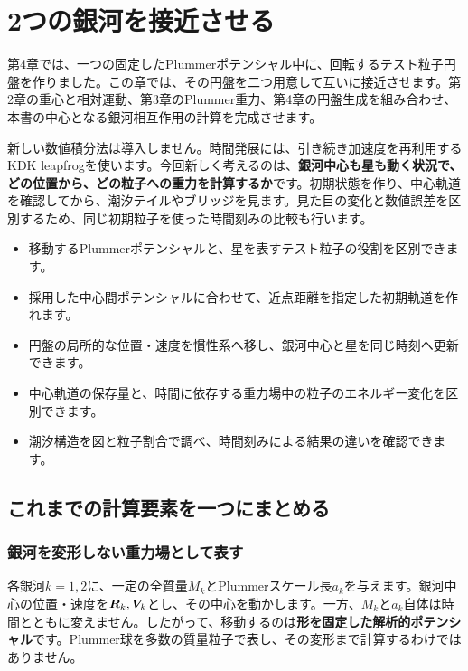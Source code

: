 \chapter{2つの銀河を接近させる}
\label{chap:interaction}

第4章では、一つの固定したPlummerポテンシャル中に、回転するテスト粒子円盤を作りました。この章では、その円盤を二つ用意して互いに接近させます。第2章の重心と相対運動、第3章のPlummer重力、第4章の円盤生成を組み合わせ、本書の中心となる銀河相互作用の計算を完成させます。

新しい数値積分法は導入しません。時間発展には、引き続き加速度を再利用するKDK leapfrogを使います。今回新しく考えるのは、\textbf{銀河中心も星も動く状況で、どの位置から、どの粒子への重力を計算するか}です。初期状態を作り、中心軌道を確認してから、潮汐テイルやブリッジを見ます。見た目の変化と数値誤差を区別するため、同じ初期粒子を使った時間刻みの比較も行います。

\begin{goalbox}[この章で学ぶこと]
\begin{itemize}
\item 移動するPlummerポテンシャルと、星を表すテスト粒子の役割を区別できます。
\item 採用した中心間ポテンシャルに合わせて、近点距離を指定した初期軌道を作れます。
\item 円盤の局所的な位置・速度を慣性系へ移し、銀河中心と星を同じ時刻へ更新できます。
\item 中心軌道の保存量と、時間に依存する重力場中の粒子のエネルギー変化を区別できます。
\item 潮汐構造を図と粒子割合で調べ、時間刻みによる結果の違いを確認できます。
\end{itemize}
\end{goalbox}

\section{これまでの計算要素を一つにまとめる}
\label{sec:ch5-model}
\subsection{銀河を変形しない重力場として表す}
各銀河$k=1,2$に、一定の全質量$M_k$とPlummerスケール長$a_k$を与えます。銀河中心の位置・速度を$\boldsymbol R_k,\boldsymbol V_k$とし、その中心を動かします。一方、$M_k$と$a_k$自体は時間とともに変えません。したがって、移動するのは\textbf{形を固定した解析的ポテンシャル}です。Plummer球を多数の質量粒子で表し、その変形まで計算するわけではありません。

